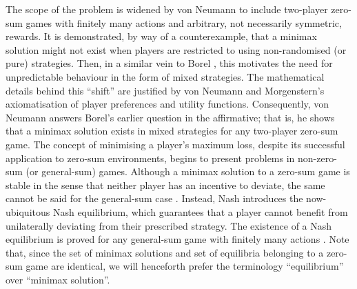     The scope of the problem is widened by von Neumann \parencite{vonNeumann1959} to include two-player zero-sum games with finitely many actions and arbitrary, not necessarily symmetric, rewards.
    It is demonstrated, by way of a counterexample, that a minimax solution might not exist when players are restricted to using non-randomised (or pure) strategies.
    Then, in a similar vein to Borel \parencite{Borel1921}, this motivates the need for unpredictable behaviour in the form of mixed strategies.
    The mathematical details behind this ``shift'' are justified by von Neumann and Morgenstern's \parencite{vonNeumann2004} axiomatisation of player preferences and utility functions.
    Consequently, von Neumann \parencite{vonNeumann1959} answers Borel's \parencite{Borel1927} earlier question in the affirmative; that is, he shows that a minimax solution exists in mixed strategies for any two-player zero-sum game.
    The concept of minimising a player's maximum loss, despite its successful application to zero-sum environments, begins to present problems in non-zero-sum (or general-sum) games.
    Although a minimax solution to a zero-sum game is stable in the sense that neither player has an incentive to deviate, the same cannot be said for the general-sum case \parencite{Maschler2013}.
    Instead, Nash \parencite{Nash1950} introduces the now-ubiquitous Nash equilibrium, which guarantees that a player cannot benefit from unilaterally deviating from their prescribed strategy.
    The existence of a Nash equilibrium is proved for any general-sum game with finitely many actions \parencite{Nash1950}.
    Note that, since the set of minimax solutions and set of equilibria belonging to a zero-sum game are identical, we will henceforth prefer the terminology ``equilibrium'' over ``minimax solution''.


